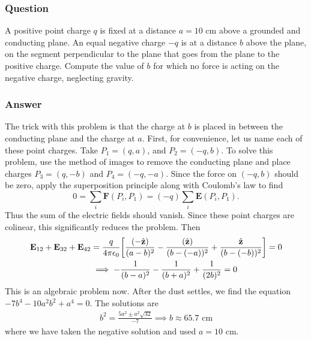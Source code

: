 \subsubsection{Question}
A positive point charge $q$ is fixed at a distance $a = 10$ cm above a grounded and conducting plane. An equal negative charge $-q$ is at a distance $b$ above the plane, on the segment perpendicular to the plane that goes from the plane to the positive charge. Compute the value of $b$ for which no force is acting on the negative charge, neglecting gravity.

\subsubsection{Answer}
The trick with this problem is that the charge at $b$ is placed in between the conducting plane and the charge at $a$. First, for convenience, let us name each of these point charges. Take $P_1 = (q,a)$, and $P_2=(-q,b)$. To solve this problem, use the method of images to remove the conducting plane and place charges $P_3 = (q,-b)$ and $P_4 = (-q,-a)$. Since the force on $(-q,b)$ should be zero, apply the superposition principle along with Coulomb's law to find
\begin{equation*}
	0=\sum_{i}\mathbf{F}(P_i,P_1) = (-q)\sum_{i}\mathbf{E}(P_i,P_1).
\end{equation*}
Thus the sum of the electric fields should vanish. Since these point charges are colinear, this significantly reduces the problem. Then
\begin{align*}
	\mathbf{E}_{12} + \mathbf{E}_{32} + \mathbf{E}_{42} &= \frac{q}{4\pi \epsilon_0}\qty[\frac{(-\hat{\mathbf{z}})}{(a-b)^2} - \frac{(\hat{\mathbf{z}})}{(b-(-a))^2} + \frac{\hat{\mathbf{z}}}{(b-(-b))^2}] = 0\\
	&\implies -\frac{1}{(b-a)^2} - \frac{1}{(b+a)^2} + \frac{1}{(2b)^2} =0
\end{align*}
This is an algebraic problem now. After the dust settles, we find the equation $-7b^4 - 10 a^2b^2 + a^4 = 0.$ The solutions are
\begin{align*}
	b^2 = \frac{5a^2\pm a^2\sqrt{32}}{-7} \implies b \approx 65.7 \text{ cm}
\end{align*}
where we have taken the negative solution and used $a=10$ cm.



